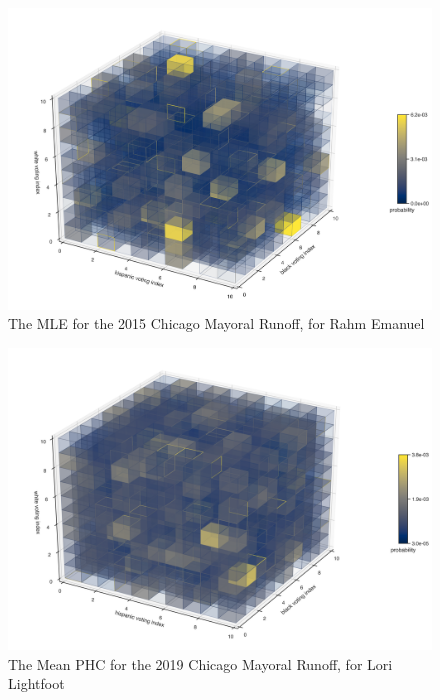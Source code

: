 \begin{figure}[ht]\centering
 \includegraphics[width=\linewidth]{figures/cm_2015_mle_phc.png}
 \caption{The MLE for the 2015 Chicago Mayoral Runoff, for Rahm Emanuel}
 \label{fig:cm_2015_mle_phc}
\end{figure}

\begin{figure}[ht]\centering
 \includegraphics[width=\linewidth]{figures/cm_2019_mean_phc.png}
 \caption{The Mean PHC for the 2019 Chicago Mayoral Runoff, for Lori Lightfoot}
 \label{fig:cm_2019_mean_phc}
\end{figure}

